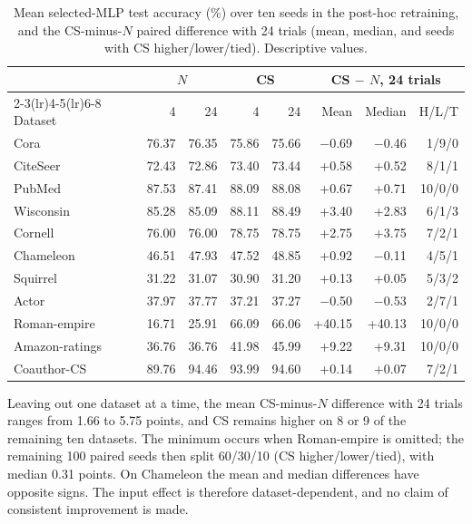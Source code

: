 \begin{table}[ht]
\centering
\caption{Mean selected-MLP test accuracy (\%) over ten seeds in the post-hoc retraining, and the CS-minus-$N$ paired difference with 24 trials (mean, median, and seeds with CS higher/lower/tied). Descriptive values.}
\label{tab:mlp_budget_datasets}
\scriptsize
\setlength{\tabcolsep}{3.2pt}
\begin{tabular}{@{}lrrrrrrr@{}}
\toprule
 & \multicolumn{2}{c}{$N$} & \multicolumn{2}{c}{CS} & \multicolumn{3}{c}{CS $-$ $N$, 24 trials} \\
\cmidrule(lr){2-3}\cmidrule(lr){4-5}\cmidrule(lr){6-8}
Dataset & 4 & 24 & 4 & 24 & Mean & Median & H/L/T \\
\midrule
Cora & 76.37 & 76.35 & 75.86 & 75.66 & $-$0.69 & $-$0.46 & 1/9/0 \\
CiteSeer & 72.43 & 72.86 & 73.40 & 73.44 & +0.58 & +0.52 & 8/1/1 \\
PubMed & 87.53 & 87.41 & 88.09 & 88.08 & +0.67 & +0.71 & 10/0/0 \\
Wisconsin & 85.28 & 85.09 & 88.11 & 88.49 & +3.40 & +2.83 & 6/1/3 \\
Cornell & 76.00 & 76.00 & 78.75 & 78.75 & +2.75 & +3.75 & 7/2/1 \\
Chameleon & 46.51 & 47.93 & 47.52 & 48.85 & +0.92 & $-$0.11 & 4/5/1 \\
Squirrel & 31.22 & 31.07 & 30.90 & 31.20 & +0.13 & +0.05 & 5/3/2 \\
Actor & 37.97 & 37.77 & 37.21 & 37.27 & $-$0.50 & $-$0.53 & 2/7/1 \\
Roman-empire & 16.71 & 25.91 & 66.09 & 66.06 & +40.15 & +40.13 & 10/0/0 \\
Amazon-ratings & 36.76 & 36.76 & 41.98 & 45.99 & +9.22 & +9.31 & 10/0/0 \\
Coauthor-CS & 89.76 & 94.46 & 93.99 & 94.60 & +0.14 & +0.07 & 7/2/1 \\
\bottomrule
\end{tabular}
\end{table}

Leaving out one dataset at a time, the mean CS-minus-$N$ difference with 24 trials ranges from 1.66 to 5.75 points, and CS remains higher on 8 or 9 of the remaining ten datasets. The minimum occurs when Roman-empire is omitted; the remaining 100 paired seeds then split 60/30/10 (CS higher/lower/tied), with median 0.31 points. On Chameleon the mean and median differences have opposite signs. The input effect is therefore dataset-dependent, and no claim of consistent improvement is made.

